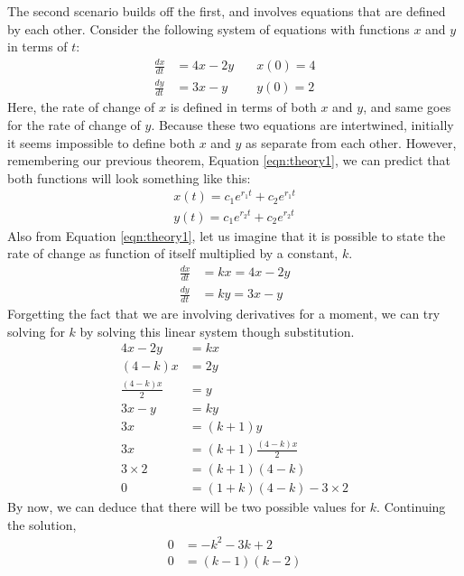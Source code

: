 \documentclass[12pt]{article}
\begin{document}
	The second scenario builds off the first, and involves equations that are defined by each other.
	Consider the following system of equations with functions $x$ and $y$ in terms of $t$:
	\begin{align}
		\frac{dx}{dt} &= 4x - 2y \quad &x(0) = 4 \\
		\frac{dy}{dt} &= 3x - y \quad &y(0) = 2
	\end{align}
	Here, the rate of change of $x$ is defined in terms of both $x$ and $y$, and same goes for the rate of change of $y$.
	Because these two equations are intertwined, initially it seems impossible to define both $x$ and $y$ as separate from each other.
	However, remembering our previous theorem, Equation \eqref{eqn:theory1}, we can predict that both functions will look something like this:
	\begin{align}
		x(t) = c_1e^{r_1t} + c_2e^{r_1t} \label{eqn:x-t-general}\\
		y(t) = c_1e^{r_2t} + c_2e^{r_2t} \label{eqn:y-t-general}
	\end{align}
	Also from Equation \eqref{eqn:theory1}, let us imagine that it is possible to state the rate of change as function of itself multiplied by a constant, $k$.
	\begin{align}
		\frac{dx}{dt} &= kx = 4x - 2y \label{eqn:kx-sys}\\
		\frac{dy}{dt} &= ky = 3x - y \label{eqn:ky-sys}
	\end{align}
	Forgetting the fact that we are involving derivatives for a moment, we can try solving for $k$ by solving this linear system though substitution.
	\begin{align}
		4x - 2y &= kx \nonumber \\
		(4 - k)x &= 2y \nonumber \\
		\frac{(4 - k)x}{2} &= y \nonumber \\
		3x - y &=ky \nonumber \\
		3x &= (k + 1)y \nonumber \\
		3x &= (k + 1)\frac{(4 - k)x}{2} \nonumber \\
		3\times2 &= (k + 1)(4 - k) \nonumber \\
		0 &= (1 + k)(4 - k) - 3\times2 \label{eqn:chr-polynomial-ex}
	\end{align}
	By now, we can deduce that there will be two possible values for $k$.
	Continuing the solution,
	\begin{align}
		0 &= -k^2 - 3k + 2 \nonumber \\
		0 &= (k - 1)(k - 2)
	\end{align}
\end{document}
